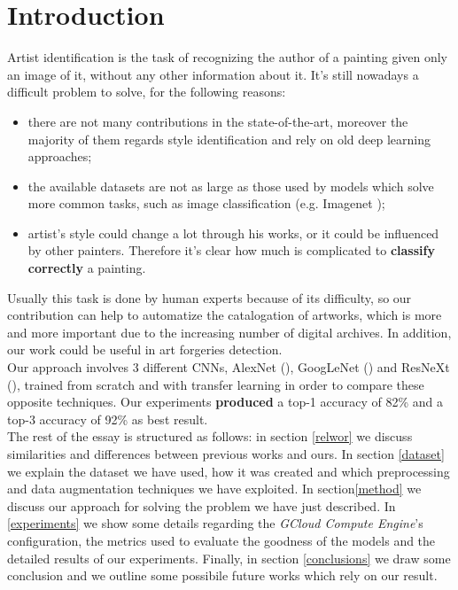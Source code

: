 \documentclass{article}
\begin{document}
\section{Introduction}
Artist identification is the task of recognizing the author of a painting given only an image of it, without any other information about it. It's still nowadays a difficult problem to solve, for the following reasons:
\begin{itemize}
	\item there are not many contributions in the state-of-the-art, moreover the majority of them regards style identification and rely on old deep learning approaches;
	\item the available datasets are not as large as those used by models which solve more common tasks, such as image classification (e.g. Imagenet \cite{imagenet});
	\item artist's style could change a lot through his works, or it could be influenced by other painters. Therefore it's clear how much is complicated to \textbf{classify correctly} a painting. 
\end{itemize}
Usually this task is done by human experts because of its difficulty, so our contribution can help to automatize the catalogation of artworks, which is more and more important due to the increasing number of  digital archives. In addition, our work could be useful in art forgeries detection.\\
Our approach involves 3 different CNNs, AlexNet (\cite{alexnet}), GoogLeNet (\cite{googlenet}) and ResNeXt (\cite{resneXt}), trained from scratch and with transfer learning in order to compare these opposite techniques. Our experiments \textbf{produced} a top-1 accuracy of 82\%  and a top-3 accuracy of 92\% as best result.\\


The rest of the essay is structured as follows: in section \ref{relwor} we discuss  similarities and differences between previous works and ours. In section \ref{dataset} we explain the dataset we have used, how it was created and which preprocessing and data augmentation techniques we have exploited. In section\ref{method}
we discuss our approach for solving the problem we have just described. In \ref{experiments} we show some details regarding the \textit{GCloud Compute Engine}'s configuration, the metrics used to evaluate the goodness of the models and the detailed results of our experiments. Finally, in section \ref{conclusions} we draw some conclusion and we outline some possibile future works which rely on our result.
\end{document}
